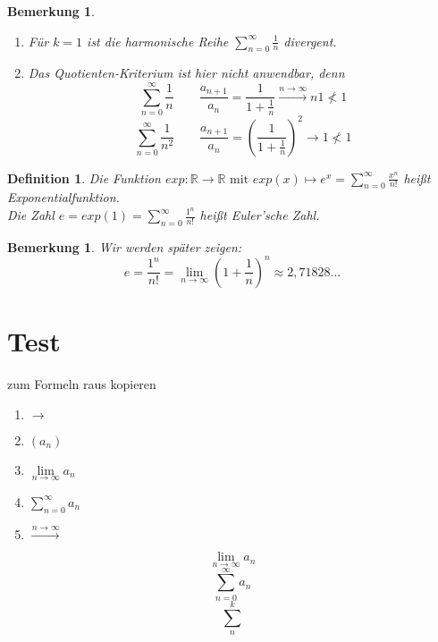 \documentclass[a4paper,titlepage,oneside]{article}
\def\R{\ensuremath{\mathbb{R}} }
\def\e{\ensuremath{\mathit{e}}}
\newcommand{\suminf}[2][n]{\ensuremath{\sum_{#1= 0}^{\infty}{#2}}}
\newcommand{\Sum}[2]{\sum_{#1}^{#2}}
\renewcommand{\liminf}[2][n]{\ensuremath{\lim\limits_{#1 \rightarrow \infty}{#2}}}
\newcommand{\longtoinf}[1][n]{\ensuremath{\overset{\scriptscriptstyle{#1 \to \infty}}{\longrightarrow}}}
\theoremstyle{thmstyle}
\newtheorem{defi}[satz]{Definition}
\newtheorem{bem}[satz]{Bemerkung}
\begin{document}
\begin{bem}
\begin{enumerate}
\item Für \(k = 1\) ist die harmonische Reihe \suminf{\frac{1}{n}} divergent.
\item Das Quotienten-Kriterium ist hier nicht anwendbar, denn \\
\[\suminf{\frac{1}{n}} \qquad \frac{a_{n+1}}{a_n} = \frac{1}{1 + \frac{1}{n}} \longtoinf{n} 1 \not < 1\]
\[\suminf{\frac{1}{n^2}} \qquad \frac{a_{n+1}}{a_n} = \left(\frac{1}{1 + \frac{1}{n}}\right)^2 \longrightarrow 1 \not < 1\]
\end{enumerate}
\end{bem}

\begin{defi}
Die Funktion \(exp: \R \to \R \text{ mit } exp(x) \mapsto \e^x = \suminf{\frac{x^n}{n!}}\) heißt Exponentialfunktion.\\
Die Zahl \(\e = exp(1) = \suminf{\frac{1^n}{n!}} \) heißt Euler'sche Zahl.
\end{defi}

\begin{bem}
Wir werden später zeigen:
\[\e = \frac{1^n}{n!} = \liminf{\left(1 + \frac{1}{n}\right)^n} \approx 2,71828...\]
\end{bem}




 






















\newpage
\section{Test}
zum Formeln raus kopieren
\begin{enumerate}
\item \(\to\)
\item $(a_n)$
\item \(\liminf{a_n}\)
\item \(\suminf{a_n}\)
\item \longtoinf
\end{enumerate}
\[\liminf{a_n}\]
\[\sum_{n = 0}^{\infty}{a_n}\]
\[\Sum{n}{k}\]
\end{document}

